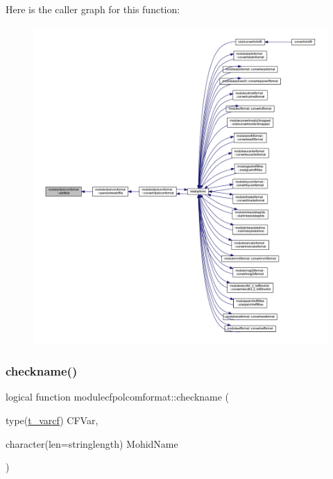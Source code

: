 Here is the caller graph for this function\+:\nopagebreak
\begin{figure}[H]
\begin{center}
\leavevmode
\includegraphics[width=350pt]{namespacemodulecfpolcomformat_aeffcbf4718c74837ddf588179800f544_icgraph}
\end{center}
\end{figure}
\mbox{\label{namespacemodulecfpolcomformat_a555e71ed3c48d8786288c63a8f0aa501}} 
\subsubsection{\texorpdfstring{checkname()}{checkname()}}
{\footnotesize\ttfamily logical function modulecfpolcomformat\+::checkname (\begin{DoxyParamCaption}\item[{type(\mbox{\hyperlink{structncdflib_1_1t__varcf}{t\+\_\+varcf}})}]{C\+F\+Var,  }\item[{character(len=stringlength)}]{Mohid\+Name }\end{DoxyParamCaption})\hspace{0.3cm}{\ttfamily [private]}}

